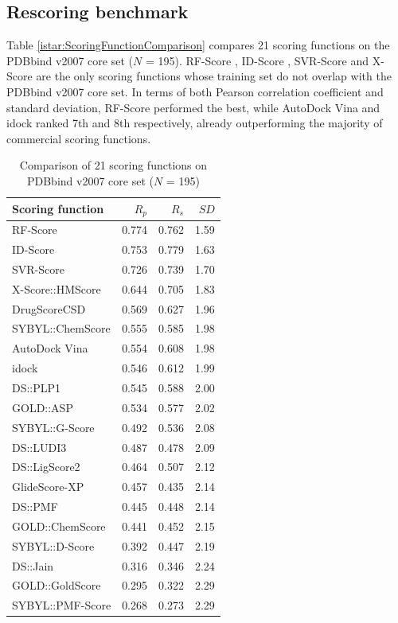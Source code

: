 \subsection{Rescoring benchmark}

Table \ref{istar:ScoringFunctionComparison} compares 21 scoring functions on the PDBbind v2007 core set ($N$ = 195). RF-Score \citep{564}, ID-Score \citep{1305}, SVR-Score \citep{1295} and X-Score \citep{573} are the only scoring functions whose training set do not overlap with the PDBbind v2007 core set. In terms of both Pearson correlation coefficient and standard deviation, RF-Score performed the best, while AutoDock Vina and idock ranked 7th and 8th respectively, already outperforming the majority of commercial scoring functions.

\begin{table}
\caption{Comparison of 21 scoring functions on PDBbind v2007 core set ($N$ = 195)}
\begin{tabular}{lrrr}
\hline
Scoring function & $R_p$ & $R_s$ & $SD$\\
\hline
RF-Score & 0.774 & 0.762 & 1.59\\
ID-Score & 0.753 & 0.779 & 1.63\\
SVR-Score & 0.726 & 0.739 & 1.70\\
X-Score::HMScore & 0.644 & 0.705 & 1.83\\
DrugScoreCSD & 0.569 & 0.627 & 1.96\\
SYBYL::ChemScore & 0.555 & 0.585 & 1.98\\
AutoDock Vina & 0.554 & 0.608 & 1.98\\
idock & 0.546 & 0.612 & 1.99\\
DS::PLP1 & 0.545 & 0.588 & 2.00\\
GOLD::ASP & 0.534 & 0.577 & 2.02\\
SYBYL::G-Score & 0.492 & 0.536 & 2.08\\
DS::LUDI3 & 0.487 & 0.478 & 2.09\\
DS::LigScore2 & 0.464 & 0.507 & 2.12\\
GlideScore-XP & 0.457 & 0.435 & 2.14\\
DS::PMF & 0.445 & 0.448 & 2.14\\
GOLD::ChemScore & 0.441 & 0.452 & 2.15\\
SYBYL::D-Score & 0.392 & 0.447 & 2.19\\
DS::Jain & 0.316 & 0.346 & 2.24\\
GOLD::GoldScore & 0.295 & 0.322 & 2.29\\
SYBYL::PMF-Score & 0.268 & 0.273 & 2.29\\

\end{tabular}
\end{table}
